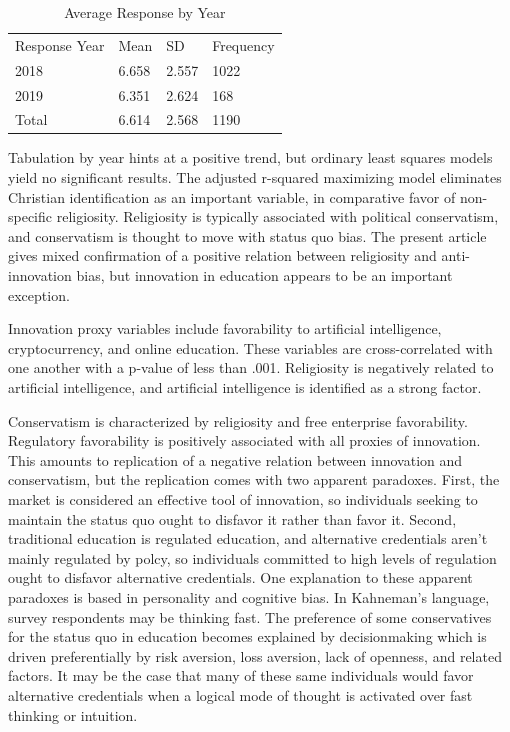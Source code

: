 \documentclass[AER]{./aea-latex-templates/AEA}
\begin{document}
        \begin{table}
            \caption{Average Response by Year}
            \begin{tabular}{llll}
                Response Year & Mean & SD & Frequency \\
                2018 & 6.658 & 2.557 & 1022 \\
                2019 & 6.351 & 2.624 & 168 \\
                Total & 6.614 & 2.568 & 1190 %
            \end{tabular}
            \label{tab:voi_by_is2018response}
            \end{table}
        
        Tabulation by year hints at a positive trend,
        but ordinary least squares models yield no significant results.
        The adjusted r-squared maximizing model eliminates Christian identification as an important variable,
        in comparative favor of non-specific religiosity.
        Religiosity is typically associated with political conservatism, and conservatism is
        thought to move with status quo bias\cite{eidelman2012bias}. The present article gives mixed
        confirmation of a positive relation between religiosity and
        anti-innovation bias, but innovation in education appears to be an important exception.
        
        Innovation proxy variables include favorability to artificial
        intelligence, cryptocurrency, and online education. These variables are
        cross-correlated with one another with a p-value of less than .001.
        Religiosity is negatively related to artificial intelligence, and
        artificial intelligence is identified as a strong factor.
        
        Conservatism is characterized by religiosity and free enterprise favorability.
        Regulatory favorability is positively associated with all proxies of innovation.
        This amounts to replication of a negative relation between innovation and conservatism,
        but the replication comes with two apparent paradoxes.
        First, the market is considered an effective tool of innovation\cite{baumol2002free},
        so individuals seeking to maintain the status quo ought to disfavor it rather than favor it.
        Second, traditional education is regulated education,
        and alternative credentials aren't mainly regulated by polcy,
        so individuals committed to high levels of regulation ought to disfavor
        alternative credentials.
        One explanation to these apparent paradoxes is based in personality and cognitive bias.
        In Kahneman's language\cite{kahneman2011thinking}, survey respondents may be thinking fast.
        The preference of some conservatives for the status quo in education becomes explained by
        decisionmaking which is driven preferentially by
        risk aversion, loss aversion, lack of openness, and related factors.
        It may be the case that many of these same individuals would favor alternative
        credentials when a logical mode of thought is activated over fast thinking or intuition.
        
\end{document}

